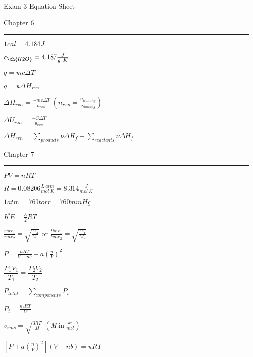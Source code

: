 \documentclass[12pt, letterpaper]{memoir}
\begin{document}
	\pagestyle{empty}
  \begin{center}
    {\Huge Exam 3 Equation Sheet}
  \end{center}

  {\large Chapter 6}

  \rule[1em]{\linewidth}{.1pt}

	\begin{minipage}{0.5\linewidth}
		$1cal=4.184J$
	
    $c_{\ch{H2O}}=4.187\frac{J}{g~K}$

		$q=mc\Delta T$
	\end{minipage}
	\begin{minipage}{0.5\linewidth}
    $q=n\Delta H_{rxn}$

    $\Delta H_{rxn}	= \frac{-mc\Delta T}{n_{rxn}}$ \hspace{1em} $\left(n_{rxn}=\frac{n_{limiting}}{\nu_{limiting}}\right)$

    $\Delta U_{rxn}	= \frac{-C\Delta T}{n_{rxn}}$ 

    $\Delta H_{rxn} = \sum\limits_{products}\nu\Delta H_{f}-\sum\limits_{reactants}\nu\Delta H_{f}$
	\end{minipage}
	
  {\large Chapter 7}

  \rule[1em]{\linewidth}{.1pt}

	\begin{minipage}{0.5\linewidth}
		$PV=nRT$		
		
    $R=0.08206\frac{L~atm}{mol~K} =8.314\frac{J}{mol~K}$
		
		$1atm=760torr=760mmHg$

    $\overline{KE}=\frac{3}{2}RT$

    $\frac{rate_1}{rate_2}=\sqrt{\frac{M_2}{M_1}}$ \hspace{1em} or \hspace{1em}
    $\frac{time_1}{time_2}=\sqrt{\frac{M_1}{M_2}}$
			
    $P=\frac{nRT}{V-nb}-a\left(\frac{n}{V}\right)^2$
	\end{minipage}
	\begin{minipage}{0.5\linewidth}
		$\dfrac{P_1V_1}{T_1}=\dfrac{P_2V_2}{T_2}$

    $P_{total}=\sum\limits_{components}P_i$

    $P_i=\frac{n_iRT}{V}$		

    $v_{rms}=\sqrt{\frac{3RT}{M}}$ \hspace{2em} $\left(M \mathrm{~in~} \frac{kg}{mol}\right)$

    $\left[P+a\left(\frac{n}{V}\right)^2\right]\left(V-nb\right)=nRT$
	\end{minipage}
\end{document}
